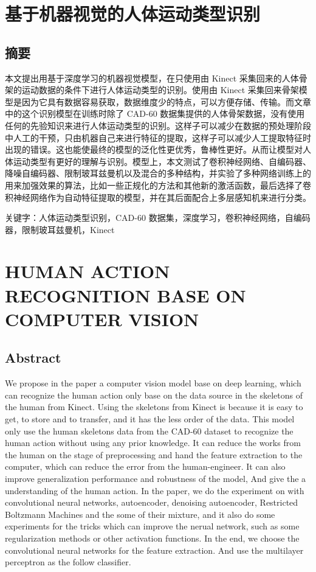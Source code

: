 \section{基于机器视觉的人体运动类型识别}\label{ux57faux4e8eux673aux5668ux89c6ux89c9ux7684ux4ebaux4f53ux8fd0ux52a8ux7c7bux578bux8bc6ux522b}

\subsection{摘要}\label{ux6458ux8981}

本文提出用基于深度学习的机器视觉模型，在只使用由 Kinect
采集回来的人体骨架的运动数据的条件下进行人体运动类型的识别。使用由
Kinect
采集回来骨架模型是因为它具有数据容易获取，数据维度少的特点，可以方便存储、传输。而文章中的这个识别模型在训练时除了
CAD-60
数据集提供的人体骨架数据，没有使用任何的先验知识来进行人体运动类型的识别。这样子可以减少在数据的预处理阶段中人工的干预，只由机器自己来进行特征的提取，这样子可以减少人工提取特征时出现的错误。这也能使最终的模型的泛化性更优秀，鲁棒性更好。从而让模型对人体运动类型有更好的理解与识别。模型上，本文测试了卷积神经网络、自编码器、降噪自编码器、限制玻耳兹曼机以及混合的多种结构，并实验了多种网络训练上的用来加强效果的算法，比如一些正规化的方法和其他新的激活函数，最后选择了卷积神经网络作为自动特征提取的模型，并在其后面配合上多层感知机来进行分类。

关键字：人体运动类型识别，CAD-60
数据集，深度学习，卷积神经网络，自编码器，限制玻耳兹曼机，Kinect

\section{HUMAN ACTION RECOGNITION BASE ON COMPUTER
VISION}\label{human-action-recognition-base-on-computer-vision}

\subsection{Abstract}\label{abstract}

We propose in the paper a computer vision model base on deep learning,
which can recognize the human action only base on the data source in the
skeletons of the human from Kinect. Using the skeletons from Kinect is
because it is easy to get, to store and to transfer, and it has the less
order of the data. This model only use the human skeletons data from the
CAD-60 dataset to recognize the human action without using any prior
knowledge. It can reduce the works from the human on the stage of
preprocessing and hand the feature extraction to the computer, which can
reduce the error from the human-engineer. It can also improve
generalization performance and robustness of the model, And give the a
understanding of the human action. In the paper, we do the experiment on
with convolutional neural networks, autoencoder, denoising autoencoder,
Restricted Boltzmann Machines and the some of their mixture, and it also
do some experiments for the tricks which can improve the nerual network,
such as some regularization methods or other activation functions. In
the end, we choose the convolutional neural networks for the feature
extraction. And use the multilayer perceptron as the follow classifier.

